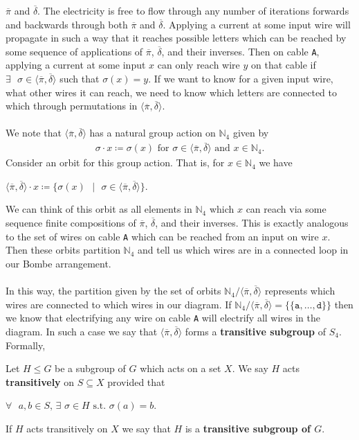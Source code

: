 $\overline\pi$ and $\overline\delta$. The electricity is free to flow
through any number of iterations forwards and backwards through both
$\overline\pi$ and $\overline\delta$. Applying a current at some
input wire will propagate in such a way that it reaches possible
letters which can be reached by some sequence of applications of
$\overline\pi$, $\overline\delta$, and their inverses. Then on cable
\texttt{A}, applying a current at some input $x$ can only reach wire
$y$ on that cable if $\exists\text{ }\sigma\in\langle\overline\pi,
\overline\delta\rangle$ such that $\sigma(x) = y$. If we want to know
for a given input wire, what other wires it can reach, we need to
know which letters are connected to which through permutations in
$\langle\overline\pi, \overline\delta\rangle$.
\\\\We note that $\langle\overline\pi, \overline\delta\rangle$ has a
natural group action on $\mathbb{N}_{4}$ given by
\begin{align*}
  \sigma\cdot{x} \coloneq \sigma(x)\text{ for
  }\sigma\in\langle\overline\pi, \overline\delta\rangle\text{ and
  }x\in\mathbb{N}_{4}.
\end{align*}
Consider an orbit for this group action. That is, for
$x\in\mathbb{N}_{4}$ we have
\begin{center}
  $\langle\overline\pi, \overline\delta\rangle\cdot
  x\coloneq\{\sigma(x)\text{ }|\text{ }\sigma\in\langle\overline\pi,
  \overline\delta\rangle\}$.
\end{center}
\noindent We can think of this orbit as all elements in
$\mathbb{N}_{4}$ which $x$ can reach via some sequence finite
compositions of $\overline\pi$, $\overline\delta$, and their
inverses. This is exactly analogous to the set of wires on cable
\texttt{A} which can be reached from an input on wire $x$. Then these
orbits partition $\mathbb{N}_{4}$ and tell us which wires are in a
connected loop in our Bombe arrangement.
\\\\In this way, the partition given by the set of orbits
$\mathbb{N}_{4}/\langle\overline\pi, \overline\delta\rangle$
represents which wires are connected to which wires in our diagram.
If $\mathbb{N}_{4}/\langle\overline\pi, \overline\delta\rangle =
\{\{\texttt{a},\dots,\texttt{d}\}\}$ then we know that electrifying
any wire on cable \texttt{A} will electrify all wires in the diagram.
In such a case we say that $\langle\overline\pi,
\overline\delta\rangle$ forms a {\bf{transitive subgroup}} of $S_4$. Formally,
\begin{definition}
  Let $H\le{G}$ be a subgroup of $G$ which acts on a set $X$. We say
  $H$ acts {\bf{transitively}} on $S\subseteq{X}$ provided that
  \begin{center}
    $\forall\text{ }a,b\in S\text{, }\exists\text{
    }\sigma\in{H}\text{ s.t. }\sigma(a)=b$.
  \end{center}
  If $H$ acts transitively on $X$ we say that $H$ is a
  {\bf{transitive subgroup of $G$}}.
\end{definition}

